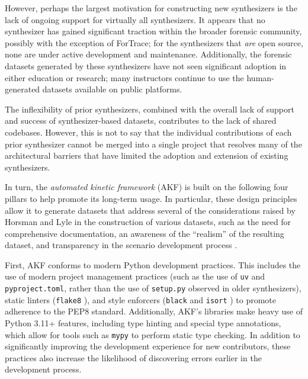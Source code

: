 \documentclass[letterpaper,12pt]{report}
\newcommand{\passthrough}[1]{#1}
\begin{document}
However, perhaps the largest motivation for constructing new
synthesizers is the lack of ongoing support for virtually all
synthesizers. It appears that no synthesizer has gained significant
traction within the broader forensic community, possibly with the
exception of ForTrace; for the synthesizers that \emph{are} open source,
none are under active development and maintenance. Additionally, the
forensic datasets generated by these synthesizers have not seen
significant adoption in either education or research; many instructors
continue to use the human-generated datasets available on public
platforms.

The inflexibility of prior synthesizers, combined with the overall lack
of support and success of synthesizer-based datasets, contributes to the
lack of shared codebases. However, this is not to say that the
individual contributions of each prior synthesizer cannot be merged into
a single project that resolves many of the architectural barriers that
have limited the adoption and extension of existing synthesizers.

In turn, the \emph{automated kinetic framework} (AKF) is built on the
following four pillars to help promote its long-term usage. In
particular, these design principles allow it to generate datasets that
address several of the considerations raised by Horsman and Lyle in the
construction of various datasets, such as the need for comprehensive
documentation, an awareness of the ``realism'' of the resulting dataset,
and transparency in the scenario development process
\cite{horsmanDatasetConstructionChallenges2021}.

First, AKF conforms to modern Python development practices. This
includes the use of modern project management practices (such as the use
of \passthrough{\lstinline!uv!} \cite{AstralshUv2025} and
\passthrough{\lstinline!pyproject.toml!}, rather than the use of
\passthrough{\lstinline!setup.py!} observed in older synthesizers),
static linters (\passthrough{\lstinline!flake8!}
\cite{PyCQAFlake82025}), and style enforcers
(\passthrough{\lstinline!black!}
\cite{langaBlackUncompromisingPython2025} and
\passthrough{\lstinline!isort!} \cite{PyCQAIsort2025}) to promote
adherence to the PEP8 standard. Additionally, AKF's libraries make heavy
use of Python 3.11+ features, including type hinting and special type
annotations, which allow for tools such as
\passthrough{\lstinline!mypy!} \cite{PythonMypy2025} to perform
static type checking. In addition to significantly improving the
development experience for new contributors, these practices also
increase the likelihood of discovering errors earlier in the development
process.
\end{document}

